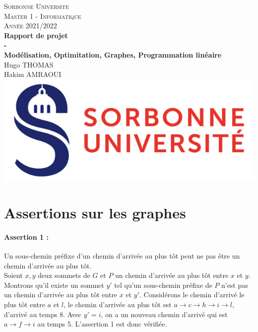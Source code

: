 \documentclass{article}
\begin{document}
\begin{titlepage}
\begin{center}

\textsc{\LARGE Sorbonne Universite} \\[1cm]
\textsc{\LARGE Master 1 - Informatique} \\[1cm]
\textsc{\Large Année 2021/2022} \\[7cm]


{\huge \bfseries Rapport de projet} \\[0.5cm]
{\huge \bfseries -} \\[0.5cm]
{\huge \bfseries Modélisation, Optimitation, Graphes, Programmation linéaire}
\\[4cm]
{\LARGE Hugo THOMAS} \\[0.5cm]
{\LARGE Hakim AMRAOUI} \\[0.5cm]
\vfill
\includegraphics[scale=0.6]{su.png}
\end{center}
\end{titlepage}

\tableofcontents
\newpage


\section{Assertions sur les graphes}


\paragraph{Assertion 1 : } Un sous-chemin préfixe d'un chemin d'arrivée au plus
tôt peut ne pas être un chemin d'arrivée au plus tôt. \\
Soient $x, y$ deux sommets de $G$ et $P$ un chemin d'arrivée au plus tôt entre
$x$ et $y$. Montrons qu'il existe un sommet $y'$ tel qu'un sous-chemin préfixe
de $P$ n'est pas un chemin d'arrivée au plus tôt entre $x$ et $y'$. Considérons
le chemin d'arrivé le plus tôt entre $a$ et $l$, le chemin d'arrivée au plus tôt
est $a \rightarrow c \rightarrow h \rightarrow i \rightarrow l$, d'arrivé au
temps 8. Avec $y' = i$, on a un nouveau chemin d'arrivé qui est $a \rightarrow
f \rightarrow i$ au temps 5. L'assertion 1 est donc vérifiée.
\end{document}
